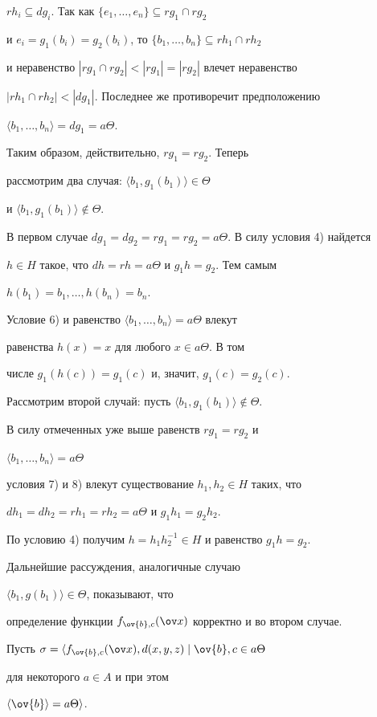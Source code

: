 \begin{pf}
$rh_i\subseteq dg_i$. Так как $\{e_1,\dotsc,e_n\}\subseteq rg_1\cap rg_2$


и $e_i=g_1(b_i)=g_2(b_i)$, то $\{b_1,\dotsc,b_n\}\subseteq rh_1\cap rh_2$


и неравенство $|rg_1\cap rg_2|<|rg_1|=|rg_2|$ влечет неравенство


$|rh_1\cap rh_2|<|dg_1|$. Последнее же противоречит предположению


$\langle b_1,\dotsc,b_n\rangle=dg_1=a\Theta$.


Таким образом, действительно, $rg_1=rg_2$. Теперь


рассмотрим два случая: $\langle b_1,g_1(b_1)\rangle\in\Theta$


и $\langle b_1,g_1(b_1)\rangle\notin\Theta$.


В первом случае $dg_1=dg_2=rg_1=rg_2=a\Theta$. В силу условия 4) найдется


$h\in H$ такое, что $dh=rh=a\Theta$ и $g_1h=g_2$. Тем самым


$h(b_1)=b_1,\dotsc,h(b_n)=b_n$.


Условие 6) и равенство $\langle b_1,\dotsc,b_n\rangle=a\Theta$ влекут


равенства $h(x)=x$ для любого $x\in a\Theta$. В том


числе $g_1(h(c))=g_1(c)$  и, значит, $g_1(c)=g_2(c)$.


Рассмотрим второй случай: пусть $\langle b_1,g_1(b_1)\rangle\notin\Theta$.


В силу отмеченных уже выше равенств $rg_1=rg_2$ и


$\langle b_1,\dotsc,b_n\rangle=a\Theta$


условия 7) и 8) влекут существование $h_1,h_2\in H$  таких, что


$dh_1=dh_2=rh_1=rh_2=a\Theta$ и $g_1h_1=g_2h_2$.


По условию 4) получим $h=h_1h_2^{-1}\in H$ и  равенство $g_1h=g_2$.


Дальнейшие рассуждения, аналогичные случаю


$\langle b_1,g(b_1)\rangle\in\Theta$, показывают, что


определение функции $f_{\ov{b},c}(\x)$ корректно и во втором случае.





Пусть $\sigma=\langle f_{\ov{b},c}(\x),d(x,y,z)\mid\ov{b},c\in a\Theta$


для некоторого $a\in A$ и при этом


$\langle\ov{b}\rangle=a\Theta\rangle$.



\end{pf}
